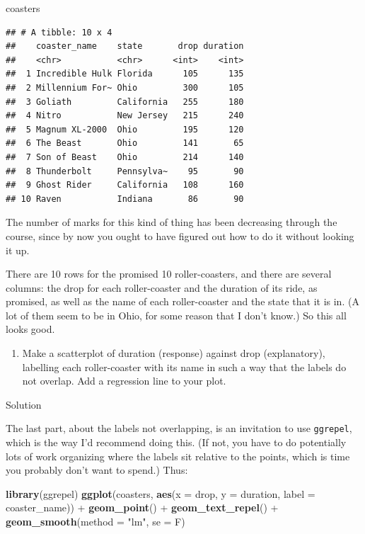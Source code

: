 \documentclass[]{tufte-book}
\newenvironment{Shaded}{}{}
\newcommand{\DataTypeTok}[1]{\textcolor[rgb]{0.56,0.13,0.00}{#1}}
\newcommand{\KeywordTok}[1]{\textcolor[rgb]{0.00,0.44,0.13}{\textbf{#1}}}
\newcommand{\NormalTok}[1]{#1}
\newcommand{\OperatorTok}[1]{\textcolor[rgb]{0.40,0.40,0.40}{#1}}
\newcommand{\StringTok}[1]{\textcolor[rgb]{0.25,0.44,0.63}{#1}}
\providecommand{\tightlist}{%
  \setlength{\itemsep}{0pt}\setlength{\parskip}{0pt}}
\theoremstyle{definition}
\theoremstyle{definition}
\theoremstyle{definition}
\theoremstyle{remark}
\begin{document}
\begin{Shaded}
\begin{Highlighting}[]
\NormalTok{coasters}
\end{Highlighting}
\end{Shaded}

\begin{verbatim}
## # A tibble: 10 x 4
##    coaster_name    state       drop duration
##    <chr>           <chr>      <int>    <int>
##  1 Incredible Hulk Florida      105      135
##  2 Millennium For~ Ohio         300      105
##  3 Goliath         California   255      180
##  4 Nitro           New Jersey   215      240
##  5 Magnum XL-2000  Ohio         195      120
##  6 The Beast       Ohio         141       65
##  7 Son of Beast    Ohio         214      140
##  8 Thunderbolt     Pennsylva~    95       90
##  9 Ghost Rider     California   108      160
## 10 Raven           Indiana       86       90
\end{verbatim}

The number of marks for this kind of thing has been decreasing through
the course, since by now you ought to have figured out how to do it
without looking it up.

There are 10 rows for the promised 10 roller-coasters, and there are
several columns: the drop for each roller-coaster and the duration of
its ride, as promised, as well as the name of each roller-coaster and
the state that it is in. (A lot of them seem to be in Ohio, for some
reason that I don't know.) So this all looks good.

\begin{enumerate}
\def\labelenumi{(\alph{enumi})}
\setcounter{enumi}{1}
\tightlist
\item
  Make a scatterplot of duration (response) against drop (explanatory),
  labelling each roller-coaster with its name in such a way that the
  labels do not overlap. Add a regression line to your plot.
\end{enumerate}

Solution

The last part, about the labels not overlapping, is an invitation to use
\texttt{ggrepel}, which is the way I'd recommend doing this. (If not,
you have to do potentially lots of work organizing where the labels sit
relative to the points, which is time you probably don't want to spend.)
Thus:

\begin{Shaded}
\begin{Highlighting}[]
\KeywordTok{library}\NormalTok{(ggrepel)}
\KeywordTok{ggplot}\NormalTok{(coasters, }\KeywordTok{aes}\NormalTok{(}\DataTypeTok{x =}\NormalTok{ drop, }\DataTypeTok{y =}\NormalTok{ duration, }\DataTypeTok{label =}\NormalTok{ coaster_name)) }\OperatorTok{+}\StringTok{ }
\StringTok{    }\KeywordTok{geom_point}\NormalTok{() }\OperatorTok{+}\StringTok{ }\KeywordTok{geom_text_repel}\NormalTok{() }\OperatorTok{+}\StringTok{ }\KeywordTok{geom_smooth}\NormalTok{(}\DataTypeTok{method =} \StringTok{"lm"}\NormalTok{, }
    \DataTypeTok{se =}\NormalTok{ F)}
\end{Highlighting}
\end{Shaded}
\end{document}
